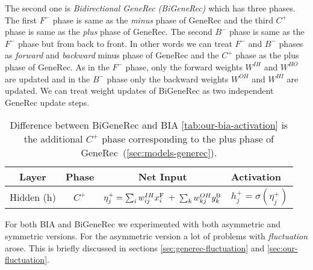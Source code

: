 The second one is \emph{Bidirectional GeneRec (BiGeneRec)} which has three phases. The first $F^{-}$ phase is same as the \emph{minus} phase of GeneRec and the third $C^{+}$ phase is same as the \emph{plus} phase of GeneRec. The second $B^{-}$ phase is same as the $F^{-}$ phase but from back to front. In other words we can treat $F^{-}$ and $B^{-}$ phases as \emph{forward} and \emph{backward} minus phase of GeneRec and the $C^{+}$ phase as the plus phase of GeneRec. As in the $F^{-}$ phase, only the forward weights $W^{IH}$ and $W^{HO}$ are updated and in the $B^{-}$ phase only the backward weights $W^{OH}$ and $W^{HI}$ are updated. We can treat weight updates of BiGeneRec as two independent GeneRec update steps. 

\begin{table}[H] 
  \centering
  \begin{tabular}{|cccl|}
    \hline
    Layer & Phase & Net Input & Activation\\
    \hline
    Hidden (h)   &  $C^{+}$  & $\eta^{+}_j = \sum_{i}w_{ij}^{IH}x^{\rm F}_i$ + $\sum_k w_{kj}^{OH}y^{\rm B}_k$ & $h^{+}_{j} = \sigma(\eta^{+}_j)$ \\
    \hline
  \end{tabular}
  \caption{Difference between BiGeneRec and BIA \ref{tab:our-bia-activation} is the additional $C^{+}$ phase corresponding to the plus phase of GeneRec~(\ref{sec:models-generec}).} 
  \label{tab:our-bigenerec-activation}
\end{table} 

For both BIA and BiGeneRec we experimented with both asymmetric and symmetric versions. For the asymmetric version a lot of problems with \emph{fluctuation} arose. This is briefly discussed in sections \ref{sec:generec-fluctuation} and \ref{sec:our-fluctuation}.  

